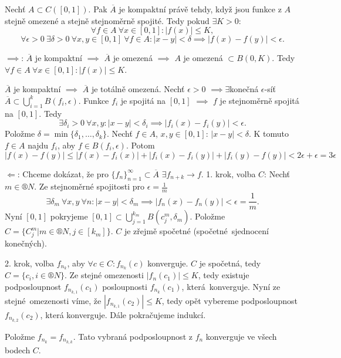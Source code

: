 \documentclass[12pt]{article}					%
\begin{document}
		\begin{veta}
			Nechť $A \subset C([0, 1])$. Pak $\overline{A}$ je kompaktní právě tehdy, když jsou funkce z $A$ stejně omezené a stejně stejnoměrně spojité. Tedy pokud $\exists K > 0$:
			$$ \forall f \in A\ \forall x \in [0, 1]: |f(x)| ≤ K, $$
			$$ \forall \epsilon > 0\ \exists \delta > 0\ \forall x, y \in [0, 1]\ \forall f \in A: |x - y| < \delta \implies |f(x) - f(y)| < \epsilon. $$

			\begin{dukazin}
				$\implies$: $\overline{A}$ je kompaktní $\implies$ $\overline{A}$ je omezená $\implies$ $A$ je omezená $\subset B(0, K)$. Tedy $\forall f \in A\ \forall x \in [0, 1]: |f(x)| ≤ K$.

				$\overline{A}$ je kompaktní $\implies$ $\overline{A}$ je totálně omezená. Nechť $\epsilon > 0$ $\implies \exists$konečná $\epsilon$-síť $\overline{A} \subset \bigcup_{i = 1}^k B(f_i, \epsilon)$. Funkce $f_i$ je spojitá na $[0, 1]$ $\implies$ $f$ je stejnoměrně spojitá na $[0, 1]$. Tedy
				$$ \exists \delta_i>0\ \forall x, y: |x - y| < \delta_i \implies |f_i(x) - f_i(y)| < \epsilon. $$
				Položme $\delta = \min\{\delta_1, …, \delta_k\}$. Nechť $f \in A$, $x, y \in [0, 1]$: $|x - y| < \delta$. K tomuto $f \in A$ najdu $f_i$, aby $f \in B(f_i, \epsilon)$. Potom
				$$ |f(x) - f(y)| ≤ |f(x) - f_i(x)| + |f_i(x) - f_i(y)| + |f_i(y) - f(y)| < 2\epsilon + \epsilon = 3\epsilon $$


				$\Leftarrow$: Chceme dokázat, že pro $\{f_n\}_{n=1}^∞ \subset \overline{A}$ $\exists f_{n + k} \rightarrow f$. 1. krok, volba $C$: Nechť $m \in ®N$. Ze stejnoměrné spojitosti pro $\epsilon = \frac{1}{m}$
				$$ \exists \delta_m\ \forall x, y\ \forall n: |x - y| < \delta_m \implies |f_n(x) - f_n(y)| < \epsilon = \frac{1}{m}. $$
				Nyní $[0, 1]$ pokryjeme $[0, 1] \subset \bigcup_{j=1}^{k_m} B(c_{j}^m, \delta_m)$. Položme $C = \{C_j^m | m \in ®N, j \in [k_{m}]\}$. $C$ je zřejmě spočetné (spočetné sjednocení konečných).

				2. krok, volba $f_{n_k}$, aby $\forall c \in C: f_{n_k}(c)$ konverguje. $C$ je spočetná, tedy $C = \{c_i, i \in ®N\}$. Ze stejné omezenosti $|f_n(c_1)| ≤ K$, tedy existuje podposloupnost $f_{n_{k, 1}}(c_1)$ posloupnosti $f_{n_k}(c_1)$, která konverguje. Nyní ze stejné omezenosti víme, že $|f_{n_{k, 1}}(c_2)| ≤ K$, tedy opět vybereme podposloupnost $f_{n_{k, 2}}(c_2)$, která konverguje. Dále pokračujeme indukcí.

				Položme $f_{n_k} = f_{n_{k, k}}$. Tato vybraná podposloupnost z $f_n$ konverguje ve všech bodech $C$.


\end{dukazin}
\end{veta}
\end{document}
